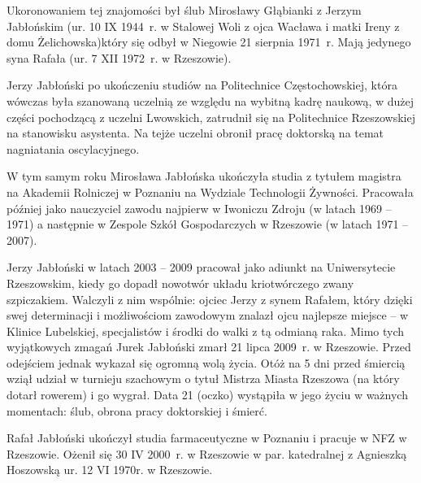 Ukoronowaniem tej znajomości był ślub Mirosławy Głąbianki z Jerzym Jabłońskim (ur. 10 IX 1944~r. w Stalowej Woli z ojca Wacława i matki Ireny z domu Żelichowska)który się odbył w Niegowie 21 sierpnia 1971~r. Mają jedynego syna Rafała (ur. 7 XII 1972~r. w Rzeszowie).

Jerzy Jabłoński po ukończeniu studiów na Politechnice Częstochowskiej, która wówczas była szanowaną uczelnią ze względu na wybitną kadrę naukową, w dużej części pochodzącą z uczelni Lwowskich, zatrudnił się na Politechnice Rzeszowskiej na stanowisku asystenta. Na tejże uczelni obronił pracę doktorską na temat nagniatania oscylacyjnego. 

W tym samym roku Mirosława Jabłońska ukończyła studia z tytułem magistra na Akademii Rolniczej w Poznaniu na Wydziale Technologii Żywności. Pracowała później jako nauczyciel zawodu najpierw w Iwoniczu Zdroju (w latach 1969 – 1971) a następnie w Zespole Szkół Gospodarczych w Rzeszowie (w latach 1971 – 2007). 

Jerzy Jabłoński w latach 2003 -- 2009 pracował jako adiunkt na Uniwersytecie Rzeszowskim, kiedy go dopadł nowotwór układu kriotwórczego zwany szpiczakiem. Walczyli z nim wspólnie: ojciec Jerzy z synem Rafałem, który dzięki swej determinacji i możliwościom zawodowym znalazł ojcu najlepsze miejsce -- w Klinice Lubelskiej, specjalistów i środki do walki z tą odmianą raka. Mimo tych wyjątkowych zmagań Jurek Jabłoński zmarł 21 lipca 2009~r. w Rzeszowie. Przed odejściem jednak wykazał się ogromną wolą życia.
Otóż na 5 dni przed śmiercią wziął udział w turnieju szachowym o tytuł Mistrza Miasta Rzeszowa (na który dotarł rowerem) i go wygrał. Data 21 (oczko) wystąpiła w jego życiu w ważnych momentach: ślub, obrona pracy doktorskiej i śmierć.

Rafał Jabłoński ukończył studia farmaceutyczne w Poznaniu i pracuje w NFZ w Rzeszowie. Ożenił się 30 IV 2000~r. w Rzeszowie w par. katedralnej z Agnieszką Hoszowską ur. 12 VI 1970r. w Rzeszowie.

